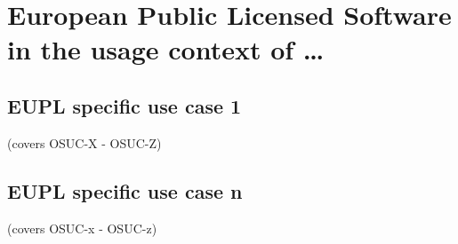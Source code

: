 %
%
%
%
%



\section{European Public Licensed Software in the usage context of \ldots}
\label{OSUC-01-EUPL} \label{OSUC-03-EUPL} 
\label{OSUC-06-EUPL} \label{OSUC-09-EUPL}

\label{OSUC-02-EUPL} \label{OSUC-04-EUPL} \label{OSUC-05-EUPL}
\label{OSUC-07-EUPL} \label{OSUC-08-EUPL} \label{OSUC-10-EUPL}


\subsection{EUPL specific use case 1}
(covers OSUC-X - OSUC-Z)

\subsection{EUPL specific use case n}
(covers OSUC-x - OSUC-z)


%
